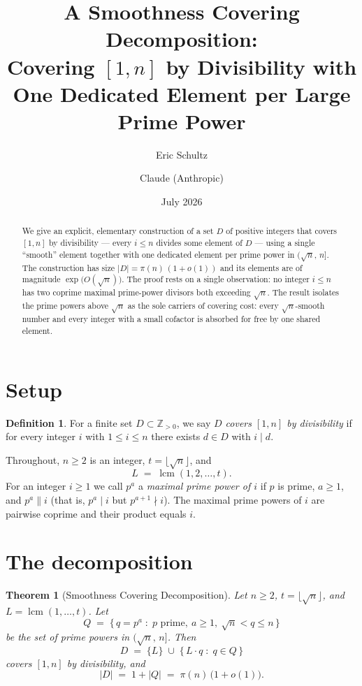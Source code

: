 \documentclass[11pt]{article}
\title{\bfseries A Smoothness Covering Decomposition:\\
\large Covering $[1,n]$ by Divisibility with One Dedicated Element per Large Prime Power}
\author{Eric Schultz \and Claude (Anthropic)}
\date{July 2026}
\newtheorem{theorem}{Theorem}
\theoremstyle{definition}
\newtheorem{definition}{Definition}
\theoremstyle{remark}
\DeclareMathOperator{\lcm}{lcm}
\begin{document}
\maketitle

\begin{abstract}
We give an explicit, elementary construction of a set $D$ of positive integers
that covers $[1,n]$ by divisibility --- every $i\le n$ divides some element of
$D$ --- using a single ``smooth'' element together with one dedicated element
per prime power in $(\sqrt n,\,n]$. The construction has size
$|D|=\pi(n)\,(1+o(1))$ and its elements are of magnitude $\exp\!\big(O(\sqrt n)\big)$.
The proof rests on a single observation: no integer $i\le n$ has two coprime
maximal prime-power divisors both exceeding $\sqrt n$. The result isolates the
prime powers above $\sqrt n$ as the sole carriers of covering cost: every
$\sqrt n$-smooth number and every integer with a small cofactor is absorbed for
free by one shared element.
\end{abstract}

\section{Setup}

\begin{definition}
For a finite set $D\subset\mathbb Z_{>0}$, we say \emph{$D$ covers $[1,n]$ by
divisibility} if for every integer $i$ with $1\le i\le n$ there exists $d\in D$
with $i\mid d$.
\end{definition}

Throughout, $n\ge 2$ is an integer, $t=\lfloor\sqrt n\rfloor$, and
\[
  L \;=\; \lcm(1,2,\dots,t).
\]
For an integer $i\ge 1$ we call $p^{a}$ a \emph{maximal prime power of $i$} if
$p$ is prime, $a\ge 1$, and $p^{a}\parallel i$ (that is, $p^{a}\mid i$ but
$p^{a+1}\nmid i$). The maximal prime powers of $i$ are pairwise coprime and
their product equals $i$.

\section{The decomposition}

\begin{theorem}[Smoothness Covering Decomposition]\label{thm:main}
Let $n\ge 2$, $t=\lfloor\sqrt n\rfloor$, and $L=\lcm(1,\dots,t)$. Let
\[
  Q \;=\; \{\, q=p^{a} \;:\; p \text{ prime},\ a\ge 1,\ \sqrt n < q \le n \,\}
\]
be the set of prime powers in $(\sqrt n,\,n]$. Then
\[
  D \;=\; \{L\}\;\cup\;\{\,L\cdot q \;:\; q\in Q\,\}
\]
covers $[1,n]$ by divisibility, and
\[
  |D| \;=\; 1+|Q| \;=\; \pi(n)\,\bigl(1+o(1)\bigr).
\]
\end{theorem}
\end{document}
